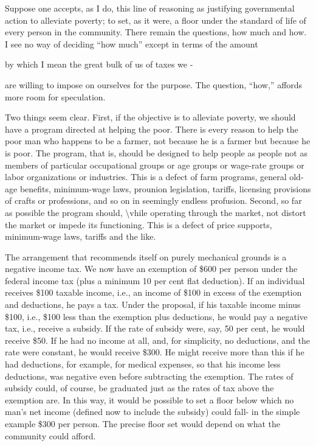 \documentclass[11pt,openany]{book}
\begin{document}
Suppose one accepts, as I do, this line of reasoning as justifying governmental action to alleviate poverty; to set, as it were, a floor under the standard of life of every person in the community. There remain the questions, how much and how. I see no way of deciding ``how much'' except in terms of the amount

by which I mean the great bulk of us of taxes we -

are willing to impose on ourselves for the purpose. The question, ``how,'' affords more room for speculation.

Two things seem clear. First, if the objective is to alleviate poverty, we should have a program directed at helping the poor. There is every reason to help the poor man who happens to be a farmer, not because he is a farmer but because he is poor. The program, that is, should be designed to help people as people not as members of particular occupational groups or age groups or wage-rate groups or labor organizations or industries. This is a defect of farm programs, general old-age benefits, minimum-wage laws, prounion legislation, tariffs, licensing provisions of crafts or professions, and so on in seemingly endless profusion. Second, so far as possible the program should, \textbackslash{}vhile operating through the market, not distort the market or impede its functioning. This is a defect of price supports, minimum-wage laws, tariffs and the like.

The arrangement that recommends itself on purely mechanical grounds is a negative income tax. We now have an exemption of \$600 per person under the federal income tax (plus a minimum 10 per cent flat deduction). If an individual receives \$100 taxable income, i.e., an income of \$100 in excess of the exemption and deductions, he pays a tax. Under the proposal, if his taxable income minus \$100, i.e., \$100 less than the exemption plus deductions, he would pay a negative tax, i.e., receive a subsidy. If the rate of subsidy were, say, 50 per cent, he would receive \$50. If he had no income at all, and, for simplicity, no deductions, and the rate were constant, he would receive \$300. He might receive more than this if he had deductions, for example, for medical expenses, so that his income less deductions, was negative even before subtracting the exemption. The rates of subsidy could, of course, be graduated just as the rates of tax above the exemption are. In this way, it would be possible to set a floor below which no man's net income (defined now to include the subsidy) could fall- in the simple example \$300 per person. The precise floor set would depend on what the community could afford.
\end{document}
